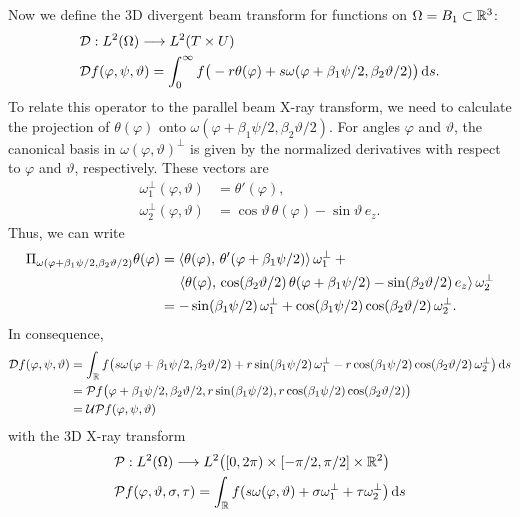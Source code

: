 \documentclass{amsart}
\renewcommand*{\phi}{\varphi}
\begin{document}
%
Now we define the 3D divergent beam transform for functions on $\Omega = B_1 \subset {\ensuremath{\mathbb{R}}}^3$:
%
\begin{align}
 &\OPD: L^2(\Omega) \Lto L^2(T \times U) \notag \\
 \label{eq:conecurved_fwdproj}
 &\OPD f(\phi, \psi, \vartheta) = \int_0^\infty f\big( -r\theta(\phi) + s\omega(\phi + \beta_1\psi/2, \beta_2\vartheta/2) \big)\, \D s.
\end{align}
%
To relate this operator to the parallel beam X-ray transform, we need to calculate the projection of $\theta(\phi)$ onto
$\omega(\phi + \beta_1\psi/2, \beta_2\vartheta/2)$. For angles $\phi$ and $\vartheta$, the canonical basis in 
$\omega(\phi, \vartheta)^\perp$ is given by the normalized derivatives with respect to $\phi$ and $\vartheta$, respectively. These vectors 
are
%
\begin{align*}
 \omega_1^\perp(\phi, \vartheta) &= \theta'(\phi), \\
 \omega_2^\perp(\phi, \vartheta) &= \cos\vartheta\, \theta(\phi) - \sin\vartheta\, e_z.
\end{align*}
%
Thus, we can write
%
\begin{align*}
 \Pi_{\omega(\phi + \beta_1\psi/2, \beta_2\vartheta/2)} \theta(\phi)
 &= \INNER{\theta(\phi)}{\theta'(\phi + \beta_1\psi/2)}\, \omega_1^\perp + \phantom{x} \\
 &\hspace{14pt} \INNER{\theta(\phi)}{\cos(\beta_2\vartheta/2)\, \theta(\phi + \beta_1\psi/2) - \sin(\beta_2\vartheta/2)\, e_z}\, 
 \omega_2^\perp \\
 &= -\sin(\beta_1\psi/2)\, \omega_1^\perp + \cos(\beta_1\psi/2) \cos(\beta_2\vartheta/2)\, \omega_2^\perp.
\end{align*}
%
In consequence,
%
\begin{align*}
 \OPD f(\phi, \psi, \vartheta)
 &= \int_\RR f\big( s\omega(\phi + \beta_1\psi/2, \beta_2\vartheta/2) + r\sin(\beta_1\psi/2)\, \omega_1^\perp - 
 r \cos(\beta_1\psi/2) \cos(\beta_2\vartheta/2)\, \omega_2^\perp \big)\, \D s \\
 &= \OPP f\big(\phi + \beta_1\psi/2, \beta_2\vartheta/2, r\sin(\beta_1\psi/2), r \cos(\beta_1\psi/2) \cos(\beta_2\vartheta/2) \big) \\
 &= \OPU \OPP f(\phi, \psi, \vartheta)
\end{align*}
%
with the 3D X-ray transform
%
\begin{align}
 &\OPP: L^2(\Omega) \Lto L^2\big( [0, 2\pi) \times [-\pi/2, \pi/2] \times \RR^2 \big) \notag \\
 \label{eq:conecurved_xray_proj}
 &\OPP f(\phi, \vartheta, \sigma, \tau) = \int_\RR f(s \omega(\phi, \vartheta) + \sigma \omega_1^\perp + \tau \omega_2^\perp \big)\, \D s
\end{align}
\end{document}
